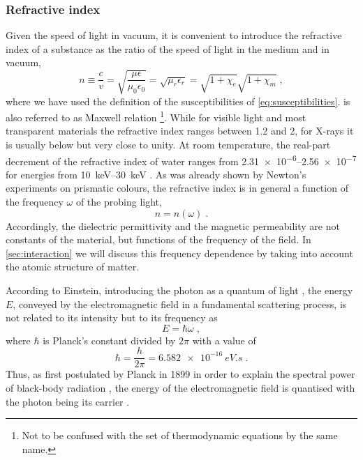 \documentclass[
twoside,
openright,
titlepage,
numbers=noenddot,
headinclude,
fleqn,
a4paper,
footinclude=true,
cleardoublepage=empty,
abstractoff,
BCOR=5mm,
paper=a4,
fontsize=11pt,
british,ngerman,american,
]{scrreprt}
\begin{document}
\subsubsection{Refractive index}
\label{sec:refractive-index}

Given the speed of light in vacuum, it is convenient to introduce the
refractive index of a substance as the ratio of the speed of light in
the medium and in vacuum,
\begin{equation}
  \label{eq:refractive-index}
  n \equiv \frac{c}{v} 
  = \sqrt{\frac{\mu\epsilon}{\mu_0\epsilon_0}} 
  = \sqrt{\mu_r\epsilon_r}=\sqrt{1+\chi_e}\sqrt{1+\chi_m} \;,
\end{equation}
where we have used the definition of the susceptibilities of
\cref{eq:susceptibilities}.   is also
referred to as Maxwell relation \footnote{Not to be confused with the
  set of thermodynamic equations by the same name.}.  While for
visible light and most transparent materials the refractive index
ranges between 1.2 and 2, for X-rays it is usually below but very
close to unity.  At room temperature, \eg{} the real-part decrement of
the refractive index of water ranges from \numrange{2.31e-6}{2.56e-7}
for energies from \SIrange{10}{30}{keV} \cite{Henke1993}.  As was
already shown by Newton's experiments on prismatic colours, the
refractive index is in general a function of the frequency $\omega$
of the probing light,
\begin{equation}
  \label{eq:refractive-index-omega}
  n = n(\omega) \;.
\end{equation}
Accordingly, the dielectric permittivity and the magnetic permeability
are not constants of the material, but functions of the frequency of
the field.  In \cref{sec:interaction} we will discuss this frequency
dependence by taking into account the atomic structure of matter.

According to Einstein, introducing the photon as a quantum of light
\cite{Einstein1905}, the energy $E$, conveyed by the electromagnetic
field in a fundamental scattering process, is not related to its
intensity but to its frequency as
\begin{equation}
  \label{eq:quantum}
  E=\hbar\omega\;,
\end{equation}
where $\hbar$ is Planck's constant divided by $2\pi$ with a value of
\begin{equation}
  \label{eq:hbar}
  \hbar = \frac{h}{2\pi} = \SI{6.582e-16}{eV.s} \;.
\end{equation}
Thus, as first postulated by Planck in 1899 in order to explain the
spectral power of black-body radiation \cite{Planck1901}, the energy
of the electromagnetic field is quantised with the photon being its
carrier \cite{Einstein1905}.
\end{document}
